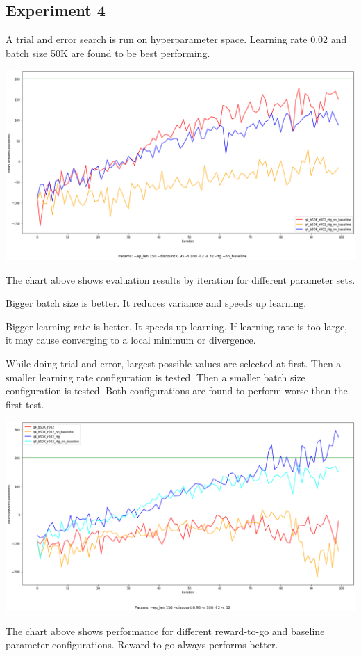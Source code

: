 \documentclass[11pt]{article}
\begin{document}
    \subsection{Experiment 4}

    A trial and error search is run on hyperparameter space.
    Learning rate 0.02 and batch size 50K are found to be best performing.

    \hspace*{-0.75in}
    \includegraphics[scale=0.35]{q4/q4_parameter_comparison}

    The chart above shows evaluation results by iteration for different parameter sets.

    Bigger batch size is better.
    It reduces variance and speeds up learning.

    Bigger learning rate is better.
    It speeds up learning.
    If learning rate is too large, it may cause converging to a local minimum or divergence.

    While doing trial and error, largest possible values are selected at first.
    Then a smaller learning rate configuration is tested.
    Then a smaller batch size configuration is tested.
    Both configurations are found to perform worse than the first test.

    \hspace*{-0.75in}
    \includegraphics[scale=0.35]{q4/q4_rtg_baseline_comparison}

    The chart above shows performance for different reward-to-go and baseline parameter configurations.
    Reward-to-go always performs better.
\end{document}
